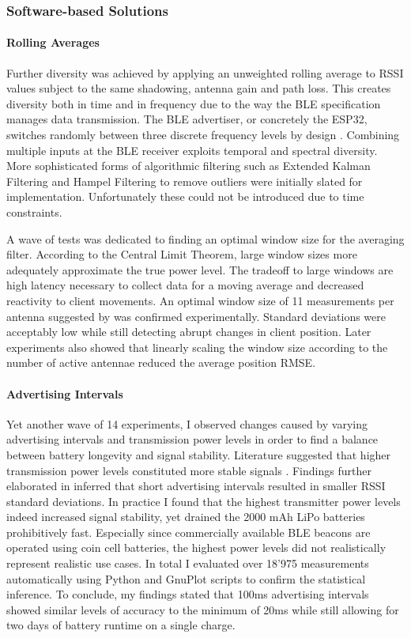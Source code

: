 \documentclass[a4paper, oneside]{ipsreport}
\begin{document}
\subsubsection{Software-based Solutions}
\paragraph{Rolling Averages}
Further diversity was achieved by applying an unweighted rolling average to RSSI values subject to the same shadowing, antenna gain and path loss. This creates diversity both in time and in frequency due to the way the BLE specification manages data transmission. The BLE advertiser, or concretely the ESP32, switches randomly between three discrete frequency levels by design \autocite{Esp32GAP}. Combining multiple inputs at the BLE receiver exploits temporal and spectral diversity. More sophisticated forms of algorithmic filtering such as Extended Kalman Filtering and Hampel Filtering to remove outliers were initially slated for implementation. Unfortunately these could not be introduced due to time constraints.

A wave of tests was dedicated to finding an optimal window size for the averaging filter. According to the Central Limit Theorem, large window sizes more adequately approximate the true power level. The tradeoff to large windows are high latency necessary to collect data for a moving average and decreased reactivity to client movements. An optimal window size of 11 measurements per antenna suggested by \autocite{BayesianFiltering} was confirmed experimentally. Standard deviations were acceptably low while still detecting abrupt changes in client position. Later experiments also showed that linearly scaling the window size according to the number of active antennae reduced the average position RMSE.

\paragraph{Advertising Intervals}
Yet another wave of 14 experiments, I observed changes caused by varying advertising intervals and transmission power levels in order to find a balance between battery longevity and signal stability. Literature suggested that higher transmission power levels constituted more stable signals \autocite{AdvertisingIntervalBestPractices}. Findings further elaborated in \autocite{AdvertisingInterval} inferred that short advertising intervals resulted in smaller RSSI standard deviations. In practice I found that the highest transmitter power levels indeed increased signal stability, yet drained the 2000 mAh LiPo batteries prohibitively fast. Especially since commercially available BLE beacons are operated using coin cell batteries, the highest power levels did not realistically represent realistic use cases. In total I evaluated  over 18'975 measurements automatically using Python and GnuPlot scripts to confirm the statistical inference. To conclude, my findings stated that 100ms advertising intervals showed similar levels of accuracy to the minimum of 20ms while still allowing for two days of battery runtime on a single charge.
\end{document}
